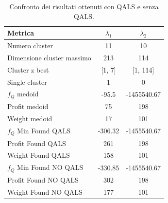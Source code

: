\documentclass[12pt, letterpaper]{article}
\begin{document}
\begin{table}[h]
\centering
\begin{tabular}{lcc}
\hline
\textbf{Metrica} & \(\lambda_1\) & \(\lambda_2\) \\
\hline
Numero cluster & 11 & 10 \\
Dimensione cluster massimo & 213 & 114 \\
Cluster z best & [1, 7] & [1, 114] \\
Single cluster & 1 & 0 \\
\(f_Q\) medoid & -95.5 &-1455540.67  \\
Profit medoid & 75 & 198 \\
Weight medoid & 17 & 101 \\
\hline
\(f_Q\) Min Found QALS & -306.32 & -1455540.67 \\
Profit Found QALS & 261 & 198 \\
Weight Found QALS & 158 & 101 \\
\hline
\(f_Q\) Min Found NO QALS & -330.85 & -1455540.67 \\
Profit Found NO QALS & 302 & 198 \\
Weight Found NO QALS & 177 & 101 \\
\hline
\end{tabular}

\caption{Confronto dei risultati ottenuti con QALS e senza QALS.}
\label{tab:confronto-qals-noqals}
\end{table}
\end{document}
